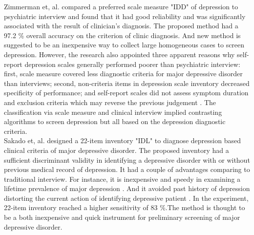 \documentclass[12pt]{article}
\begin{document}
Zimmerman et, al. \cite{Zimmerman} compared a preferred scale measure "IDD" of depression to psychiatric interview and found that it had good reliability and was significantly associated with the result of clinician's diagnosis. The proposed method had a 97.2 \% \cite{Zimmerman} overall accuracy on the criterion of clinic diagnosis. And new method is suggested to be an inexpensive way to collect large homogeneous cases to screen depression. However, the research also appointed three apparent reasons why self-report depression scales generally performed poorer than psychiatric interview: first, scale measure covered less diagnostic criteria for major depressive disorder than interviews; second, non-criteria items in depression scale inventory decreased specificity of performance; and self-report scales did not assess symptom duration and exclusion criteria which may reverse the previous judgement \cite{Zimmerman}. The classification via scale measure and clinical interview implied contrasting algorithms \cite{Zimmerman} to screen depression but all based on the depression diagnostic criteria. \\

Sakado et, al. \cite{Sakado} designed a 22-item inventory "IDL" to diagnose depression based clinical criteria of major depressive disorder. The proposed inventory had a sufficient discriminant validity in identifying a depressive disorder with or without previous medical record of depression. It had a couple of advantages comparing to traditional interview. For instance, it is inexpensive and speedy in examining a lifetime prevalence of major depression \cite{Sakado}. And it avoided past history of depression distorting the current action of identifying depressive patient \cite{Sakado}. In the experiment, 22-item inventory reached a higher sensitivity of 83 \%.The method is thought to be a both inexpensive and quick instrument for preliminary screening of major depressive disorder. 
\end{document}
